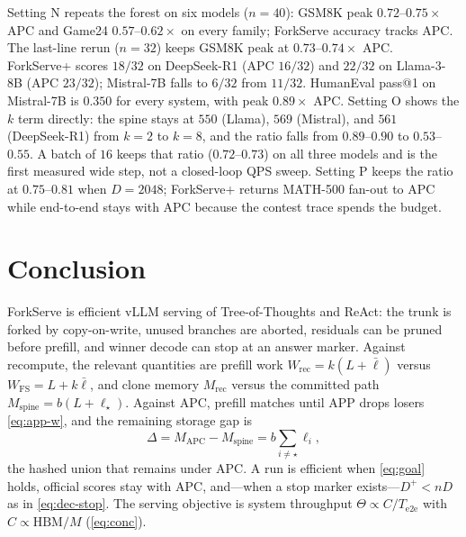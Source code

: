 \documentclass[11pt,a4paper]{article}
\begin{document}
Setting N repeats the forest on six models ($n{=}40$): GSM8K peak $0.72$--$0.75\times$ APC and Game24 $0.57$--$0.62\times$ on every family; ForkServe accuracy tracks APC.
The last-line rerun ($n{=}32$) keeps GSM8K peak at $0.73$--$0.74\times$ APC.
ForkServe+ scores $18/32$ on DeepSeek-R1 (APC $16/32$) and $22/32$ on Llama-3-8B (APC $23/32$); Mistral-7B falls to $6/32$ from $11/32$.
HumanEval pass@1 on Mistral-7B is $0.350$ for every system, with peak $0.89\times$ APC.
Setting O shows the $k$ term directly: the spine stays at $550$ (Llama), $569$ (Mistral), and $561$ (DeepSeek-R1) from $k{=}2$ to $k{=}8$, and the ratio falls from $0.89$--$0.90$ to $0.53$--$0.55$.
A batch of $16$ keeps that ratio ($0.72$--$0.73$) on all three models and is the first measured wide step, not a closed-loop QPS sweep.
Setting P keeps the ratio at $0.75$--$0.81$ when $D{=}2048$; ForkServe+ returns MATH-500 fan-out to APC while end-to-end stays with APC because the contest trace spends the budget.

\section{Conclusion}

ForkServe is efficient vLLM serving of Tree-of-Thoughts and ReAct: the trunk is forked by copy-on-write, unused branches are aborted, residuals can be pruned before prefill, and winner decode can stop at an answer marker.
Against recompute, the relevant quantities are prefill work
$W_{\mathrm{rec}}=k(L+\bar\ell)$ versus $W_{\mathrm{FS}}=L+k\bar\ell$,
and clone memory $M_{\mathrm{rec}}$ versus the committed path $M_{\mathrm{spine}}=b(L+\ell_{\star})$.
Against APC, prefill matches until APP drops losers \eqref{eq:app-w}, and the remaining storage gap is
\begin{equation}
\Delta = M_{\mathrm{APC}}-M_{\mathrm{spine}} = b\sum_{i\neq\star}\ell_i,
\end{equation}
the hashed union that remains under APC.
A run is efficient when \eqref{eq:goal} holds, official scores stay with APC, and---when a stop marker exists---$D^{+}<nD$ as in \eqref{eq:dec-stop}.
The serving objective is system throughput $\Theta\propto C/T_{\mathrm{e2e}}$ with $C\propto\mathrm{HBM}/M$ (\eqref{eq:conc}).
\end{document}
